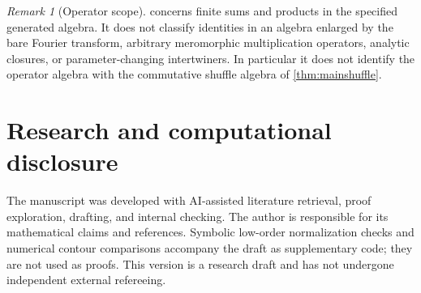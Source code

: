\documentclass[11pt]{article}
\numberwithin{equation}{section}
\theoremstyle{definition}
\theoremstyle{remark}
\newtheorem{remark}[remark]{Remark}
\begin{document}
\begin{remark}[Operator scope]
 concerns finite sums and products in the specified generated
algebra. It does not classify identities in an algebra enlarged by the bare
Fourier transform, arbitrary meromorphic multiplication operators, analytic
closures, or parameter-changing intertwiners. In particular it does not
identify the operator algebra with the commutative shuffle algebra of
\cref{thm:mainshuffle}.
\end{remark}

\section*{Research and computational disclosure}
The manuscript was developed with AI-assisted literature retrieval, proof
exploration, drafting, and internal checking. The author is responsible for
its mathematical claims and references. Symbolic low-order normalization
checks and numerical contour comparisons accompany the draft as supplementary
code; they are not used as proofs. This version is a research draft and has
not undergone independent external refereeing.
\end{document}
